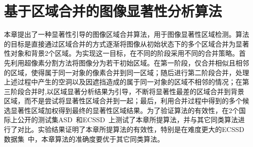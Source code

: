 

\chapter{基于区域合并的图像显著性分析算法}
\label{cha:SGRM}
本章提出了一种显著性引导的图像区域合并算法，用于图像显著性区域检测。算法的目标是直接通过区域合并的方式逐渐将图像从初始状态下的多个区域合并为显著性对象和背景2个区域。为实现这一目标，在不同的阶段采用不同的合并策略。首先利用超像素分割方法将图像分为若干初始区域。在第一阶段，仅合并相似且相邻的区域，使得属于同一对象的像素合并到同一区域；随后进行第二阶段合并，处理上述过程中产生的空洞以及因遮挡造成的属于同一对象的区域不相邻的情况；在第三阶段合并时,以区域显著分析结果为引导，不断将显著性最差的区域合并到背景区域，而不是尝试将显著性区域合并到一起；最后，利用合并过程中得到的多个候选显著性区域加权得到最终的显著性区域结果。为了验证算法的有效性，在2个国际上公开的测试集ASD~\cite{Achanta08}和ECSSD~\cite{ECSSD}上测试了本章所提算法，并与其它同类算法进行了对比。实验结果证明了本章所提算法的有效性，特别是在难度更大的ECSSD数据集~\cite{ECSSD}中，本章算法的准确度要优于其它同类算法。
